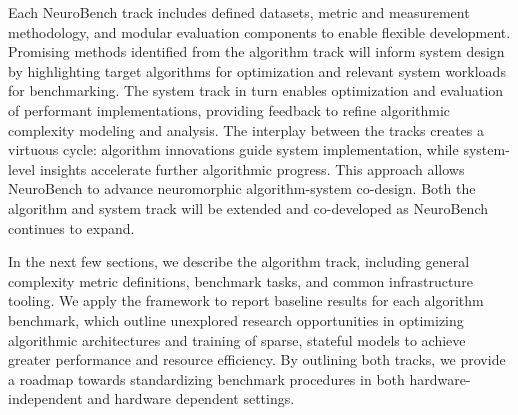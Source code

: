 Each NeuroBench track includes defined datasets, metric and measurement methodology, and modular evaluation components to enable flexible development. Promising methods identified from the algorithm track will inform system design by highlighting target algorithms for optimization and relevant system workloads for benchmarking. The system track in turn enables optimization and evaluation of performant implementations, providing feedback to refine algorithmic complexity modeling and analysis. The interplay between the tracks creates a virtuous cycle: algorithm innovations guide system implementation, while system-level insights accelerate further algorithmic progress. This approach allows NeuroBench to advance neuromorphic algorithm-system co-design. Both the algorithm and system track will be extended and co-developed as NeuroBench continues to expand.

In the next few sections, we describe the algorithm track, including general complexity metric definitions, benchmark tasks, and common infrastructure tooling. We apply the framework to report baseline results for each algorithm benchmark, which outline unexplored research opportunities in optimizing algorithmic architectures and training of sparse, stateful models to achieve greater performance and resource efficiency. 
By outlining both tracks, we provide a roadmap towards standardizing benchmark procedures in both hardware-independent and hardware dependent settings.

